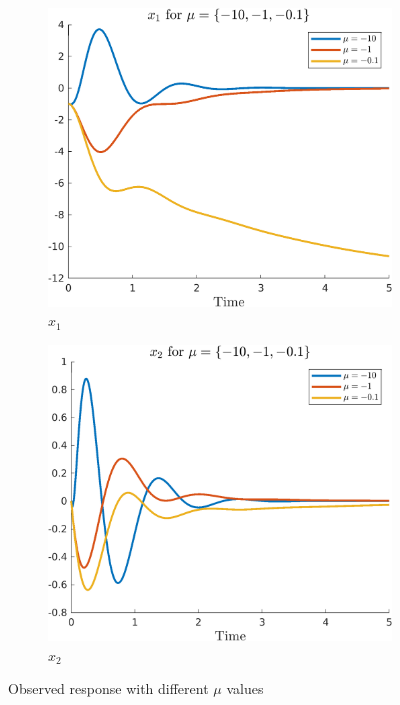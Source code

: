 \documentclass{article}
\begin{document}
\begin{figure}[H]
    \centering
    \begin{subfigure}{0.325\textwidth}
        \centering
        \includegraphics[width = \textwidth]{figures/c3-3-x1-plot.png}
        \caption{$x_1$}
    \end{subfigure}
    \begin{subfigure}{0.325\textwidth}
        \centering
        \includegraphics[width = \textwidth]{figures/c3-3-x2-plot.png}
        \caption{$x_2$}
    \end{subfigure}
    \caption{Observed response with different $\mu$ values}
    \label{fig:c-3_initial_look}
\end{figure}
\end{document}
